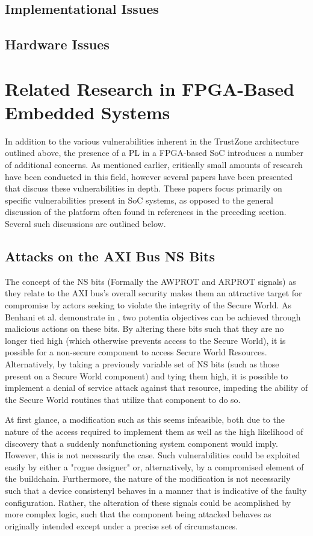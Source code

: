 \documentclass[journal]{IEEEtran}
\begin{document}
\subsection{Implementational Issues}
\subsection{Hardware Issues}

\section{Related Research in FPGA-Based Embedded Systems}
In addition to the various vulnerabilities inherent in the TrustZone architecture outlined
above, the presence of a PL in a FPGA-based SoC introduces a number of
additional concerns. As mentioned earlier, critically small amounts of research
have been conducted in this field, however several papers have been presented that discuss
these vulnerabilities in depth. These papers focus primarily on specific vulnerabilities
present in SoC systems, as opposed to the general discussion of the platform often found
in references in the preceding section. Several such discussions are outlined below.

\subsection{Attacks on the AXI Bus NS Bits}
The concept of the NS bits (Formally the AWPROT and ARPROT signals) as they relate to the
AXI bus's overall security makes them an attractive target for compromise by actors 
seeking to violate the integrity of the Secure World. As Benhani et al. demonstrate in 
\cite{benhani_security_2019}, two potentia objectives can be achieved through malicious 
actions on these bits. By altering these bits such that they are no longer tied high 
(which otherwise prevents access to the Secure World), it is possible for a non-secure 
component to access Secure World Resources. Alternatively, by taking a previously variable
set of NS bits (such as those present on a Secure World component) and tying them high, it
is possible to implement a denial of service attack against that resource, impeding the 
ability of the Secure World routines that utilize that component to do so.

At first glance, a modification such as this seems infeasible, both due to the nature of
the access required to implement them as well as the high likelihood of discovery that a
suddenly nonfunctioning system component would imply. However, this is not necessarily the
case. Such vulnerabilities could be exploited easily by either a "rogue designer" or,
alternatively, by a compromised element of the buildchain. Furthermore, the nature of the
modification is not necessarily such that a device consistenyl behaves in a manner that is
indicative of the faulty configuration. Rather, the alteration of these signals could be
acomplished by more complex logic, such that the component being attacked behaves as
originally intended except under a precise set of circumstances.
\end{document}

